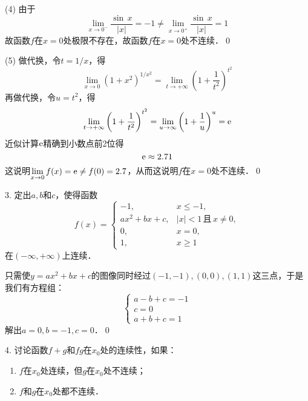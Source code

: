 (4) \prove 由于
\begin{equation}
    \lim_{x \to 0^-} \frac{\sin \, x}{\lvert x \rvert} = -1 \neq \lim_{x \to 0^+} \frac{\sin \, x}{\lvert x \rvert} = 1
\end{equation}
故函数$f$在$x=0$处极限不存在，故函数$f$在$x=0$处不连续．\qed\bigskip

(5) \prove 做代换，令$t=1/x$，得
\begin{equation}
    \lim_{x \to 0} \left(1+x^2\right)^{1/x^2} = \lim_{t \to +\infty} \left(1+\displaystyle\frac{1}{t^2}\right)^{t^2}
\end{equation}
再做代换，令$u=t^2$，得
\begin{equation}
    \lim_{t \to +\infty} \left(1+\displaystyle\frac{1}{t^2}\right)^{t^2}=\lim_{u \to \infty} \left(1+\displaystyle\frac{1}{u}\right)^u = \mathrm{e}
\end{equation}
近似计算$\mathrm{e}$精确到小数点前2位得
\begin{equation}
    \mathrm{e} \approx 2.71
\end{equation}
这说明$\displaystyle\lim_{x \to 0} f(x) = \mathrm{e} \neq f(0) = 2.7$，从而这说明$f$在$x=0$处不连续．\qed\bigskip

3. 定出$a,b$和$c$，使得函数
\begin{equation}
    f(x)=\begin{cases}
        -1, & x \leq -1, \\
        ax^2+bx+c, & \lvert x \rvert < 1 \, \text{且} \, x \neq 0, \\
        0, & x = 0, \\
        1, &x \geq 1
    \end{cases}
\end{equation}
在$(-\infty,+\infty)$上连续．

\bigskip
\solve 只需使$y = ax^2+bx+c$的图像同时经过$(-1,-1), (0,0), (1,1)$这三点，于是我们有方程组：
\begin{equation}
    \begin{cases}
        a-b+c=-1 \\
        c = 0 \\
        a+b+c=1
    \end{cases}
\end{equation}
解出$a=0,b=-1,c=0$．\qed\bigskip

4. 讨论函数$f+g$和$fg$在$x_0$处的连续性，如果：
\begin{enumerate}
    \item $f$在$x_0$处连续，但$g$在$x_0$处不连续；
    \item $f$和$g$在$x_0$处都不连续．
\end{enumerate}
\bigskip

